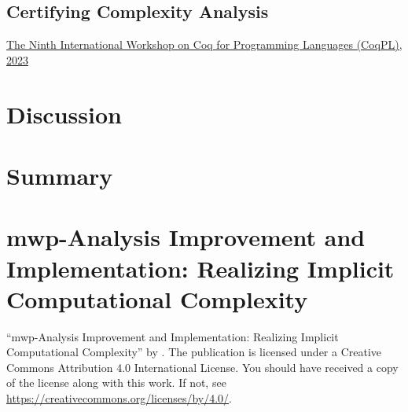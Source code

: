 \section{Certifying Complexity Analysis}\label{coqpl}
\ainfoX{\CTNT}
{\href{https://popl23.sigplan.org/home/CoqPL-2023}
{The Ninth International Workshop on Coq for Programming Languages (CoqPL), 2023}}
{\abspage{}}

\clearpage

\chapter{Discussion}\label{ch:discussion}


\chapter{Summary}\label{ch:summary}


\backmatter
\printbibliography[label=chap:references, title=References]
\let\printbibliography\relax

\appendix

\chapter{mwp-Analysis Improvement and Implementation: Realizing Implicit Computational Complexity}\label{app:sec:fscd}
{\newline\enquote{mwp-Analysis Improvement and Implementation: Realizing Implicit Computational Complexity} \textcopyright{ }by{ }\CTNT.
The publication is licensed under a Creative Commons Attribution 4.0 International License.
You should have received a copy of the license along with this work.
If not, see \url{https://creativecommons.org/licenses/by/4.0/}.}

